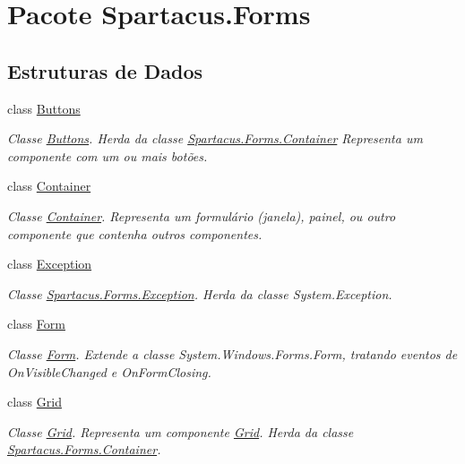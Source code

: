 \hypertarget{namespaceSpartacus_1_1Forms}{\section{Pacote Spartacus.\+Forms}
\label{namespaceSpartacus_1_1Forms}
}
\subsection*{Estruturas de Dados}
\begin{DoxyCompactItemize}
\item 
class \hyperlink{classSpartacus_1_1Forms_1_1Buttons}{Buttons}
\begin{DoxyCompactList}\small\item\em Classe \hyperlink{classSpartacus_1_1Forms_1_1Buttons}{Buttons}. Herda da classe \hyperlink{classSpartacus_1_1Forms_1_1Container}{Spartacus.\+Forms.\+Container} Representa um componente com um ou mais botões. \end{DoxyCompactList}\item 
class \hyperlink{classSpartacus_1_1Forms_1_1Container}{Container}
\begin{DoxyCompactList}\small\item\em Classe \hyperlink{classSpartacus_1_1Forms_1_1Container}{Container}. Representa um formulário (janela), painel, ou outro componente que contenha outros componentes. \end{DoxyCompactList}\item 
class \hyperlink{classSpartacus_1_1Forms_1_1Exception}{Exception}
\begin{DoxyCompactList}\small\item\em Classe \hyperlink{classSpartacus_1_1Forms_1_1Exception}{Spartacus.\+Forms.\+Exception}. Herda da classe System.\+Exception. \end{DoxyCompactList}\item 
class \hyperlink{classSpartacus_1_1Forms_1_1Form}{Form}
\begin{DoxyCompactList}\small\item\em Classe \hyperlink{classSpartacus_1_1Forms_1_1Form}{Form}. Extende a classe System.\+Windows.\+Forms.\+Form, tratando eventos de On\+Visible\+Changed e On\+Form\+Closing. \end{DoxyCompactList}\item 
class \hyperlink{classSpartacus_1_1Forms_1_1Grid}{Grid}
\begin{DoxyCompactList}\small\item\em Classe \hyperlink{classSpartacus_1_1Forms_1_1Grid}{Grid}. Representa um componente \hyperlink{classSpartacus_1_1Forms_1_1Grid}{Grid}. Herda da classe \hyperlink{classSpartacus_1_1Forms_1_1Container}{Spartacus.\+Forms.\+Container}. \end{DoxyCompactList}\item 

\end{DoxyCompactItemize}
